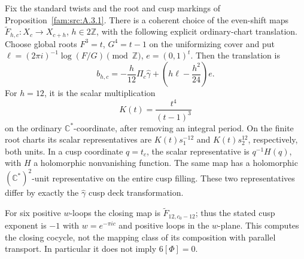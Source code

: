 \begin{cited}\label{push:src:C.3.5}

Fix the standard twists and the root and cusp markings of Proposition~\ref{fam:src:A.3.1}.
There is a coherent choice of the even-shift maps
\(\widetilde F_{h,c}:X_c\to X_{c+h}\), \(h\in2\mathbb Z\),
with the following explicit ordinary-chart translation. Choose global
roots \(F^3=t\), \(G^4=t-1\) on the uniformizing cover and put
\(\ell=(2\pi i)^{-1}\log(F/G)\pmod{\mathbb Z}\), \(e=(0,1)^t\).
Then the translation is
\begin{equation}\label{mapsI:closing:eq:C-explicit-closing}
 b_{h,c}=-\frac h{12}\Pi_c\widehat\gamma
              +\left(h\ell-\frac{h^2}{24}\right)e.
\end{equation}
For \(h=12\), it is the scalar multiplication
\begin{equation}\label{mapsI:closing:eq:C-twelve-scalar}
 K(t)=\frac{t^4}{(t-1)^3}
\end{equation}
on the ordinary \(\mathbb C^*\)-coordinate, after removing an integral
period. On the finite root charts its scalar representatives are
\(K(t)s_1^{-12}\) and \(K(t)s_2^{12}\), respectively, both units.
In a cusp coordinate \(q=t_c\), the scalar representative is
\(q^{-1}H(q)\), with \(H\) a holomorphic nonvanishing function.
The same map has a holomorphic \((\mathbb C^*)^2\)-unit representative
on the entire cusp filling. These two representatives differ by
exactly the \(\widehat\gamma\) cusp deck transformation.

For six positive \(w\)-loops the closing map is
\(\widetilde F_{12,c_0-12}\); thus the stated cusp exponent is \(-1\)
with $w=e^{-\pi i c}$ and positive loops in the $w$-plane. This computes the closing
cocycle, not the mapping class of its composition with parallel
transport. In particular it does not imply \(6[\Phi]=0\).
\end{cited}
